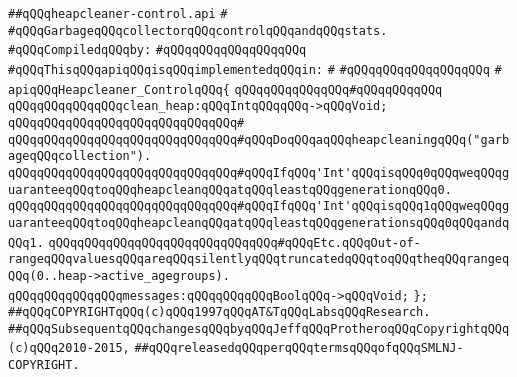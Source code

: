 \label{src/lib/std/src/nj/heapcleaner-control.api}
\verb|##qQQqheapcleaner-control.api|\newline
\verb|#|\newline
\verb|#qQQqGarbageqQQqcollectorqQQqcontrolqQQqandqQQqstats.|\newline
\newline
\verb|#qQQqCompiledqQQqby:|\newline
\verb|#qQQqqQQqqQQqqQQqqQQq|\newline
\newline
\newline
\newline
\newline
\verb|#qQQqThisqQQqapiqQQqisqQQqimplementedqQQqin:|\newline
\verb|#|\newline
\verb|#qQQqqQQqqQQqqQQqqQQq|\newline
\verb|#|\newline
\verb|apiqQQqHeapcleaner_ControlqQQq{|\newline
\verb|qQQqqQQqqQQqqQQq#qQQqqQQqqQQq|\newline
\verb|qQQqqQQqqQQqqQQqclean_heap:qQQqIntqQQqqQQq->qQQqVoid;|\newline
\verb|qQQqqQQqqQQqqQQqqQQqqQQqqQQqqQQq#|\newline
\verb|qQQqqQQqqQQqqQQqqQQqqQQqqQQqqQQq#qQQqDoqQQqaqQQqheapcleaningqQQq("garbageqQQqcollection").|\newline
\verb|qQQqqQQqqQQqqQQqqQQqqQQqqQQqqQQq#qQQqIfqQQq'Int'qQQqisqQQq0qQQqweqQQqguaranteeqQQqtoqQQqheapcleanqQQqatqQQqleastqQQqgenerationqQQq0.|\newline
\verb|qQQqqQQqqQQqqQQqqQQqqQQqqQQqqQQq#qQQqIfqQQq'Int'qQQqisqQQq1qQQqweqQQqguaranteeqQQqtoqQQqheapcleanqQQqatqQQqleastqQQqgenerationsqQQq0qQQqandqQQq1.|\newline
\verb|qQQqqQQqqQQqqQQqqQQqqQQqqQQqqQQq#qQQqEtc.qQQqOut-of-rangeqQQqvaluesqQQqareqQQqsilentlyqQQqtruncatedqQQqtoqQQqtheqQQqrangeqQQq(0..heap->active_agegroups).|\newline
\newline
\verb|qQQqqQQqqQQqqQQqmessages:qQQqqQQqqQQqBoolqQQq->qQQqVoid;|\newline
\newline
\newline
\verb|};|\newline
\newline
\newline
\newline
\newline
\verb|##qQQqCOPYRIGHTqQQq(c)qQQq1997qQQqAT&TqQQqLabsqQQqResearch.|\newline
\verb|##qQQqSubsequentqQQqchangesqQQqbyqQQqJeffqQQqProtheroqQQqCopyrightqQQq(c)qQQq2010-2015,|\newline
\verb|##qQQqreleasedqQQqperqQQqtermsqQQqofqQQqSMLNJ-COPYRIGHT.|\newline

